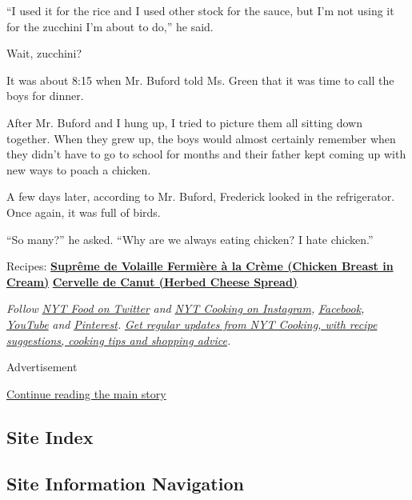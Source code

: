 ``I used it for the rice and I used other stock for the sauce, but I'm
not using it for the zucchini I'm about to do,'' he said.

Wait, zucchini?

It was about 8:15 when Mr. Buford told Ms. Green that it was time to
call the boys for dinner.

After Mr. Buford and I hung up, I tried to picture them all sitting down
together. When they grew up, the boys would almost certainly remember
when they didn't have to go to school for months and their father kept
coming up with new ways to poach a chicken.

A few days later, according to Mr. Buford, Frederick looked in the
refrigerator. Once again, it was full of birds.

``So many?'' he asked. ``Why are we always eating chicken? I hate
chicken.''

Recipes:
\textbf{\href{https://cooking.nytimes3xbfgragh.onion/recipes/1021177-supreme-de-volaille-fermiere-a-la-creme-chicken-breast-in-cream}{Suprême
de Volaille Fermière à la Crème (Chicken Breast in Cream)}} \textbar{}
\textbf{\href{https://cooking.nytimes3xbfgragh.onion/recipes/1021178-cervelle-de-canut-herbed-cheese-spread}{Cervelle
de Canut (Herbed Cheese Spread)}}

\emph{Follow} \href{https://twitter.com/nytfood}{\emph{NYT Food on
Twitter}} \emph{and}
\href{https://www.instagram.com/nytcooking/}{\emph{NYT Cooking on
Instagram}}\emph{,}
\href{https://www.facebookcorewwwi.onion/nytcooking/}{\emph{Facebook}}\emph{,}
\href{https://www.youtube.com/nytcooking}{\emph{YouTube}} \emph{and}
\href{https://www.pinterest.com/nytcooking/}{\emph{Pinterest}}\emph{.}
\href{https://www.nytimes3xbfgragh.onion/newsletters/cooking}{\emph{Get
regular updates from NYT Cooking, with recipe suggestions, cooking tips
and shopping advice}}\emph{.}

Advertisement

\protect\hyperlink{after-bottom}{Continue reading the main story}

\hypertarget{site-index}{%
\subsection{Site Index}\label{site-index}}

\hypertarget{site-information-navigation}{%
\subsection{Site Information
Navigation}\label{site-information-navigation}}


